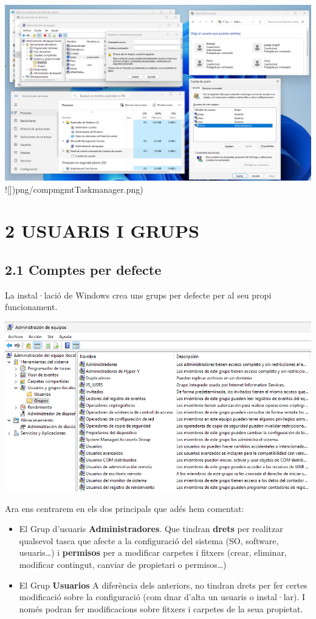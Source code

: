 \documentclass[
  a4paper,
]{article}
\begin{document}
\includegraphics{png/123.png} !{[}{]})png/compmgmtTaskmanager.png)

\section{2 USUARIS I GRUPS}\label{usuaris-i-grups}

\subsection{2.1 Comptes per defecte}\label{comptes-per-defecte}

La instal·lació de Windows crea uns grups per defecte per al seu propi
funcionament.

\includegraphics{png/grupsPerdefecte.png}

Ara ens centrarem en els dos principals que adés hem comentat:

\begin{itemize}
\item
  El Grup d'usuaris \textbf{Administradores}. Que tindran \textbf{drets}
  per realitzar qualsevol tasca que afecte a la configuració del sistema
  (SO, software, usuaris\ldots) i \textbf{permisos} per a modificar
  carpetes i fitxers (crear, eliminar, modificar contingut, canviar de
  propietari o permisos\ldots)
\item
  El Grup \textbf{Usuarios} A diferència dels anteriors, no tindran
  drets per fer certes modificació sobre la configuració (com dnar
  d'alta un usuaris o instal·lar). I només podran fer modificacions
  sobre fitxers i carpetes de la seua propietat.
\end{itemize}
\end{document}
